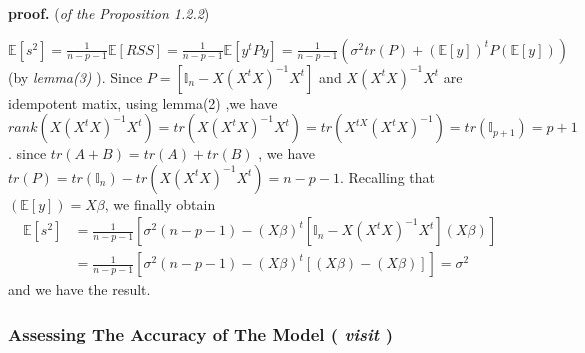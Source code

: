 \documentclass[12pt]{report}
\begin{document}
	\textbf{proof.} (\textit{of the Proposition 1.2.2})
	{\selectfont
		
		$\mathbb{E}[s^{2}]=\frac{1}{n-p-1}\mathbb{E}[RSS]= \frac{1}{n-p-1}\mathbb{E}[y^{t}Py]=\frac{1}{n-p-1}(\sigma^{2}tr(P) + (\mathbb{E}[y])^{t}P(\mathbb{E}[y]))$ (by   \textit{lemma(3)} ).  Since $P=[\mathbb{I}_{n}-X(X^{t}X)^{-1}X^{t}]$ and $X(X^{t}X)^{-1}X^{t}$ are idempotent matix, using lemma(2) ,we have $rank(X(X^{t}X)^{-1}X^{t})=tr(X(X^{t}X)^{-1}X^{t})=tr(X^{tX}(X^{t}X)^{-1})=tr(\mathbb{I}_{p+1})=p+1$. since $tr(A+B)=tr(A)+tr(B)$ , we have $tr(P)=tr(\mathbb{I}_{n})-tr(X(X^{t}X)^{-1}X^{t})=n-p-1$. Recalling that $(\mathbb{E}[y])=X\beta$, we finally obtain
		\begin{align*}
			\mathbb{E}[s^{2}]&=\frac{1}{n-p-1}[\sigma^{2}(n-p-1) -(X\beta)^{t}[\mathbb{I}_{n}-X(X^{t}X)^{-1}X^{t}](X\beta)]\\
			&= \frac{1}{n-p-1}[\sigma^{2}(n-p-1) -(X\beta)^{t}[(X\beta)-(X\beta)]]=\sigma^{2}
		\end{align*}
		and we have the result.
	}
	\subsubsection{Assessing The Accuracy of The Model ( \textit{ visit \cite{ref1}})} 
	
\end{document}
